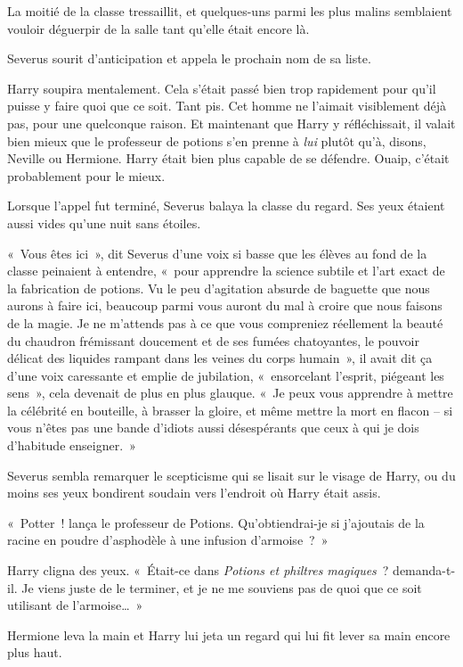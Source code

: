 La moitié de la classe tressaillit, et quelques-uns parmi les plus malins semblaient vouloir déguerpir de la salle tant qu'elle était encore là.

Severus sourit d'anticipation et appela le prochain nom de sa liste.

Harry soupira mentalement.
Cela s'était passé bien trop rapidement pour qu'il puisse y faire quoi que ce soit.
Tant pis.
Cet homme ne l'aimait visiblement déjà pas, pour une quelconque raison.
Et maintenant que Harry y réfléchissait, il valait bien mieux que le professeur de potions s'en prenne à \emph{lui} plutôt qu'à, disons, Neville ou Hermione.
Harry était bien plus capable de se défendre.
Ouaip, c'était probablement pour le mieux.

Lorsque l'appel fut terminé, Severus balaya la classe du regard.
Ses yeux étaient aussi vides qu'une nuit sans étoiles.

«~Vous êtes ici~», dit Severus d'une voix si basse que les élèves au fond de la classe peinaient à entendre, «~pour apprendre la science subtile et l'art exact de la fabrication de potions.
Vu le peu d'agitation absurde de baguette que nous aurons à faire ici, beaucoup parmi vous auront du mal à croire que nous faisons de la magie.
Je ne m'attends pas à ce que vous compreniez réellement la beauté du chaudron frémissant doucement et de ses fumées chatoyantes, le pouvoir délicat des liquides rampant dans les veines du corps humain~», il avait dit ça d'une voix caressante et emplie de jubilation, «~ensorcelant l'esprit, piégeant les sens~», cela devenait de plus en plus glauque.
«~Je peux vous apprendre à mettre la célébrité en bouteille, à brasser la gloire, et même mettre la mort en flacon -- si vous n'êtes pas une bande d'idiots aussi désespérants que ceux à qui je dois d'habitude enseigner.~»

Severus sembla remarquer le scepticisme qui se lisait sur le visage de Harry, ou du moins ses yeux bondirent soudain vers l'endroit où Harry était assis.

«~Potter~! lança le professeur de Potions.
Qu'obtiendrai-je si j'ajoutais de la racine en poudre d'asphodèle à une infusion d'armoise~?~»

Harry cligna des yeux.
«~Était-ce dans \emph{Potions et philtres magiques}~? demanda-t-il.
Je viens juste de le terminer, et je ne me souviens pas de quoi que ce soit utilisant de l'armoise…~»

Hermione leva la main et Harry lui jeta un regard qui lui fit lever sa main encore plus haut.

